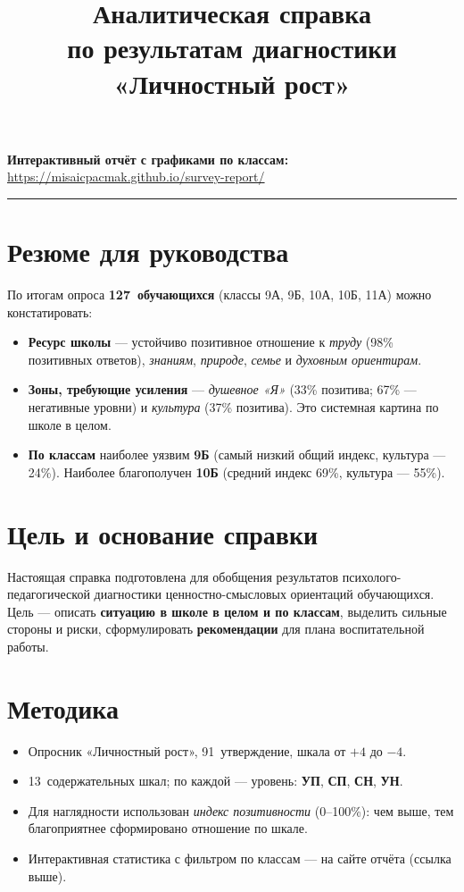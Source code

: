 \documentclass[12pt,a4paper]{article}
\title{Аналитическая справка\\[0.4em]
\large по результатам диагностики «Личностный рост»}
\author{}
\date{}
\begin{document}
\maketitle
\thispagestyle{empty}

\noindent\textbf{Интерактивный отчёт с графиками по классам:}\\
\url{https://misaicpacmak.github.io/survey-report/}

\vspace{0.8em}
\noindent\rule{\textwidth}{0.4pt}

\section*{Резюме для руководства}

По итогам опроса \textbf{127~обучающихся} (классы 9А, 9Б, 10А, 10Б, 11А) можно констатировать:

\begin{itemize}
    \item \textbf{Ресурс школы} --- устойчиво позитивное отношение к \textit{труду} (98\% позитивных ответов), \textit{знаниям}, \textit{природе}, \textit{семье} и \textit{духовным ориентирам}.
    \item \textbf{Зоны, требующие усиления} --- \textit{душевное «Я»} (33\% позитива; 67\% --- негативные уровни) и \textit{культура} (37\% позитива). Это системная картина по школе в целом.
    \item \textbf{По классам} наиболее уязвим \textbf{9Б} (самый низкий общий индекс, культура --- 24\%). Наиболее благополучен \textbf{10Б} (средний индекс 69\%, культура --- 55\%).
\end{itemize}

\section{Цель и основание справки}

Настоящая справка подготовлена для обобщения результатов психолого-педагогической диагностики ценностно-смысловых ориентаций обучающихся. Цель --- описать \textbf{ситуацию в школе в целом и по классам}, выделить сильные стороны и риски, сформулировать \textbf{рекомендации} для плана воспитательной работы.

\section{Методика}

\begin{itemize}
    \item Опросник «Личностный рост», 91~утверждение, шкала от $+4$ до $-4$.
    \item 13~содержательных шкал; по каждой --- уровень: \textbf{УП}, \textbf{СП}, \textbf{СН}, \textbf{УН}.
    \item Для наглядности использован \textit{индекс позитивности} (0--100\%): чем выше, тем благоприятнее сформировано отношение по шкале.
    \item Интерактивная статистика с фильтром по классам --- на сайте отчёта (ссылка выше).
\end{itemize}
\end{document}
